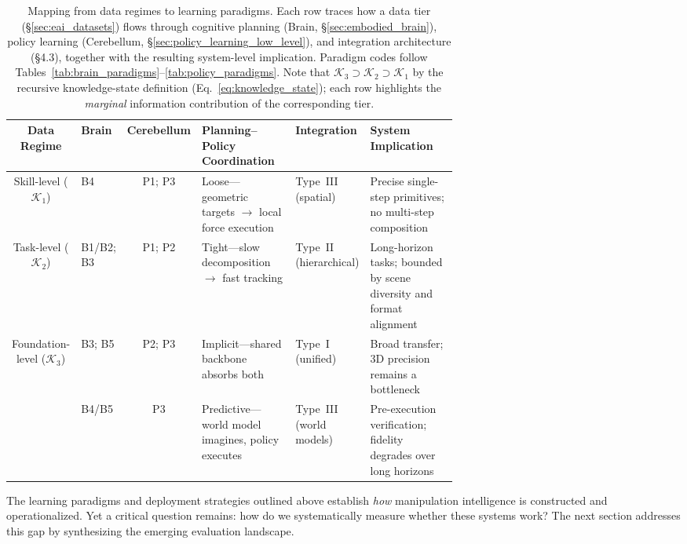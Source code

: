 \documentclass[acmsmall,screen,review,anonymous]{acmart}
\begin{document}
\begin{table}[t]
\centering
\caption{Mapping from data regimes to learning paradigms. Each row traces how a data tier (\S\ref{sec:eai_datasets}) flows through cognitive planning (Brain, \S\ref{sec:embodied_brain}), policy learning (Cerebellum, \S\ref{sec:policy_learning_low_level}), and integration architecture (\S4.3), together with the resulting system-level implication. Paradigm codes follow Tables~\ref{tab:brain_paradigms}--\ref{tab:policy_paradigms}. Note that $\mathcal{K}_3 \supset \mathcal{K}_2 \supset \mathcal{K}_1$ by the recursive knowledge-state definition (Eq.~\ref{eq:knowledge_state}); each row highlights the \emph{marginal} information contribution of the corresponding tier.}\label{tab:data_learning_map}
\renewcommand{\arraystretch}{1.3}
\setlength{\tabcolsep}{3pt}
\scriptsize
\begin{tabular}{
  c
  >{\centering\arraybackslash}p{0.06\linewidth}
  c
  p{0.25\linewidth}
  >{\centering\arraybackslash}p{0.10\linewidth}
  p{0.25\linewidth}
}
\toprule
\textbf{Data Regime} &
\textbf{Brain} &
\textbf{Cerebellum} &
\textbf{Planning--Policy Coordination} &
\textbf{Integration} &
\textbf{System Implication} \\
\midrule
Skill-level ($\mathcal{K}_1$) &
B4 &
P1; P3 &
Loose---geometric targets $\to$ local force execution &
Type~III (spatial) &
Precise single-step primitives; no multi-step composition \\
\midrule
Task-level ($\mathcal{K}_2$) &
B1/B2; B3 &
P1; P2 &
Tight---slow decomposition $\to$ fast tracking &
Type~II (hierarchical) &
Long-horizon tasks; bounded by scene diversity and format alignment \\
\midrule
\multirow{2}{*}[-1.2em]{Foundation-level ($\mathcal{K}_3$)} &
B3; B5 &
P2; P3 &
Implicit---shared backbone absorbs both &
Type~I (unified) &
Broad transfer; 3D precision remains a bottleneck \\
\cmidrule{2-6}
 &
B4/B5 &
P3 &
Predictive---world model imagines, policy executes &
Type~III (world models) &
Pre-execution verification; fidelity degrades over long horizons \\
\bottomrule
\end{tabular}
\end{table}

The learning paradigms and deployment strategies outlined above establish \emph{how} manipulation intelligence is constructed and operationalized. Yet a critical question remains: how do we systematically measure whether these systems work? The next section addresses this gap by synthesizing the emerging evaluation landscape.
\end{document}
